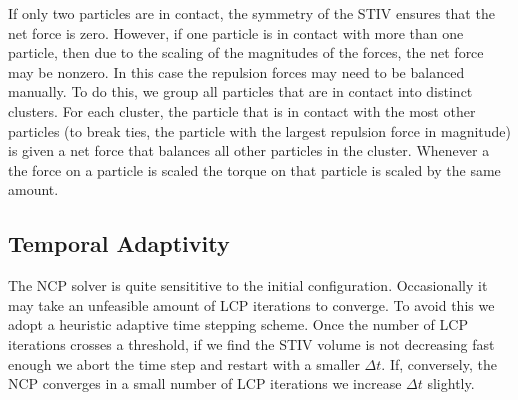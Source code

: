 \documentclass[preprint, 10pt]{elsarticle}
\begin{document}
If only two particles are in contact, the symmetry of the STIV ensures that the
net force is zero. However, if one particle is in contact with more than one
particle, then due to the scaling of the magnitudes of the forces, the net force may be nonzero. In
this case the repulsion forces may need to be balanced manually. To do this, we group all particles
that are in contact into distinct clusters.
For each cluster, the particle that is in contact with the most other particles
(to break ties, the particle with the largest repulsion force in magnitude) is
given a net force that balances all other particles in the
cluster. Whenever a the force on a particle is scaled the torque on that
particle is scaled by the same amount.

\subsection{Temporal Adaptivity}

The NCP solver is quite sensititive to the initial configuration. Occasionally it may take an unfeasible amount of LCP iterations to converge. To avoid this we adopt a heuristic adaptive time stepping scheme. Once the number of LCP iterations crosses a threshold, if we find the STIV volume is not decreasing fast enough we abort the time step and restart with a smaller $\Delta t$. If, conversely, the NCP converges in a small number of LCP iterations we increase $\Delta t$ slightly.
\end{document}
